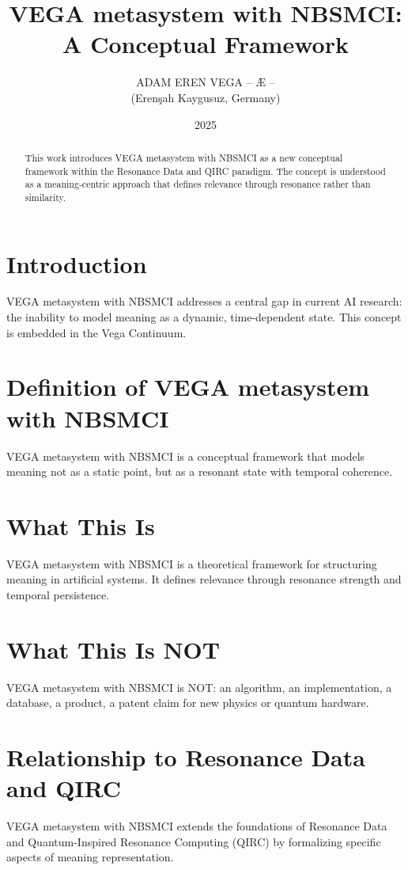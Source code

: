 \documentclass[12pt,a4paper]{article}
\title{VEGA metasystem with NBSMCI: A Conceptual Framework}
\author{ADAM EREN VEGA – Æ – \\ (Erenşah Kaygusuz, Germany)}
\date{2025}
\begin{document}
\maketitle

\begin{abstract}
This work introduces VEGA metasystem with NBSMCI as a new conceptual framework within the Resonance Data and QIRC paradigm. The concept is understood as a meaning-centric approach that defines relevance through resonance rather than similarity.
\end{abstract}

\section{Introduction}
VEGA metasystem with NBSMCI addresses a central gap in current AI research: the inability to model meaning as a dynamic, time-dependent state. This concept is embedded in the Vega Continuum.

\section{Definition of VEGA metasystem with NBSMCI}
VEGA metasystem with NBSMCI is a conceptual framework that models meaning not as a static point, but as a resonant state with temporal coherence.

\section{What This Is}
VEGA metasystem with NBSMCI is a theoretical framework for structuring meaning in artificial systems. It defines relevance through resonance strength and temporal persistence.

\section{What This Is NOT}
VEGA metasystem with NBSMCI is NOT: an algorithm, an implementation, a database, a product, a patent claim for new physics or quantum hardware.

\section{Relationship to Resonance Data and QIRC}
VEGA metasystem with NBSMCI extends the foundations of Resonance Data and Quantum-Inspired Resonance Computing (QIRC) by formalizing specific aspects of meaning representation.
\end{document}
